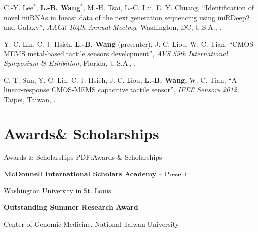 \documentclass[a4paper,12pt,oneside]{article}
\begin{document}
\begin{body}
\begin{publication}[widest*=100]
    \item
        C.-Y. Lee$^*$, \textbf{L.-B. Wang}$^*$, M.-H. Tsai, L.-C. Lai, E. Y. Chuang,
        ``Identification of novel miRNAs in breast data of the next generation sequencing using miRDeep2 and Galaxy'',
        \textit{AACR 104th Annual Meeting},
        Washington, DC, U.S.A.,
        .

    \item
        Y.-C. Lin, C.-J. Hsieh, \textbf{L.-B. Wang} (presenter), J.-C. Liou, W.-C. Tian,
        ``CMOS MEMS metal-based tactile sensors development'',
        \textit{AVS 59th International Symposium \& Exhibition},
        Florida, U.S.A.,
        .

    \item
        C.-T. Sun, Y.-C. Lin, C.-J. Hsieh, J.-C. Liou, \textbf{L.-B. Wang,} W.-C. Tian,
        ``A linear-response CMOS-MEMS capacitive tactile sensor'',
        \textit{IEEE Sensors 2012},
        Taipei, Taiwan,
        .

\end{publication}



\section
{Awards\newline\& Scholarships}
{Awards \& Scholarships}
{PDF:Awards \& Scholarships}

\href{https://global.wustl.edu/mcdonnell-academy/}
{\textbf{McDonnell International Scholars Academy}}
\hfill
{} --
Present
\par
Washington University in St. Louis

\EntryGapNoBreak
\textbf{Outstanding Summer Research Award}
\hfill
{}
\par
Center of Genomic Medicine, National Taiwan University




\end{body}
\end{document}
